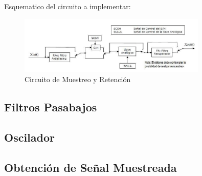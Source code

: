 Esquematico del circuito a implementar:
\begin{figure}[H]
    \centering
    \includegraphics[width=0.8\textwidth]{Imagenes/Circuito_Muestreo.png}
    \caption{Circuito de Muestreo y Retención}
    \label{fig:Circuito_Muestreo}
\end{figure}

\subsection{Filtros Pasabajos}

\subsection{Oscilador}

\subsection{Obtención de Señal Muestreada}

